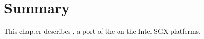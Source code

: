 \section{Summary}

This chapter describes \graphenesgx{},
a port of the \graphene{} \libos{} on the Intel SGX platforms.
